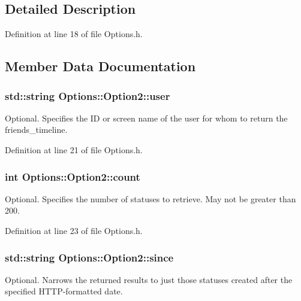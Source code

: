 \subsection{Detailed Description}


Definition at line 18 of file Options.h.

\subsection{Member Data Documentation}
\hypertarget{structOptions_1_1Option2_4b4acb0acc11bd5f5a9c6a4e8e083b61}{
\subsubsection{\setlength{\rightskip}{0pt plus 5cm}std::string {\bf Options::Option2::user}}}
\label{structOptions_1_1Option2_4b4acb0acc11bd5f5a9c6a4e8e083b61}


Optional. Specifies the ID or screen name of the user for whom to return the friends\_\-timeline. 



Definition at line 21 of file Options.h.\hypertarget{structOptions_1_1Option2_6c4dbe83e6027381adbbb5dd39989448}{
\subsubsection{\setlength{\rightskip}{0pt plus 5cm}int {\bf Options::Option2::count}}}
\label{structOptions_1_1Option2_6c4dbe83e6027381adbbb5dd39989448}


Optional. Specifies the number of statuses to retrieve. May not be greater than 200. 



Definition at line 23 of file Options.h.\hypertarget{structOptions_1_1Option2_c03c10675d4f7ee92dd836f56d794076}{
\subsubsection{\setlength{\rightskip}{0pt plus 5cm}std::string {\bf Options::Option2::since}}}
\label{structOptions_1_1Option2_c03c10675d4f7ee92dd836f56d794076}


Optional. Narrows the returned results to just those statuses created after the specified HTTP-formatted date. 



